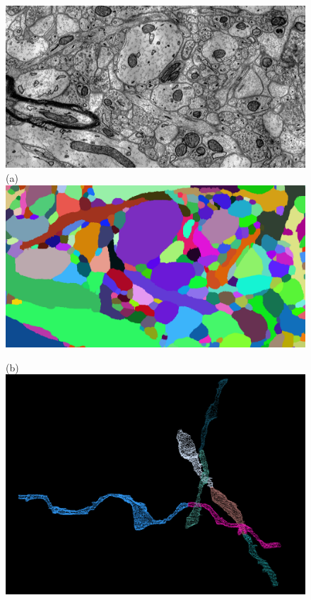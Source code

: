 \documentclass[10pt,twocolumn,letterpaper]{article}
\begin{document}
\begin{figure}[t]\footnotesize
	\vspace{-2.3in}
	\begin{minipage}{\textwidth}
		\begin{minipage}{0.2\textwidth}
			 \includegraphics[width=\linewidth]{figures/schema/teaser-image.png}
			(a)\includegraphics[width=\linewidth]{figures/schema/teaser-segmentation.png}
		\end{minipage}
		\begin{minipage}{0.2\textwidth}
			(b)\includegraphics[width=\linewidth]{figures/schema/pre-multicut.png}

\end{minipage}
\end{minipage}
\end{figure}
\end{document}
